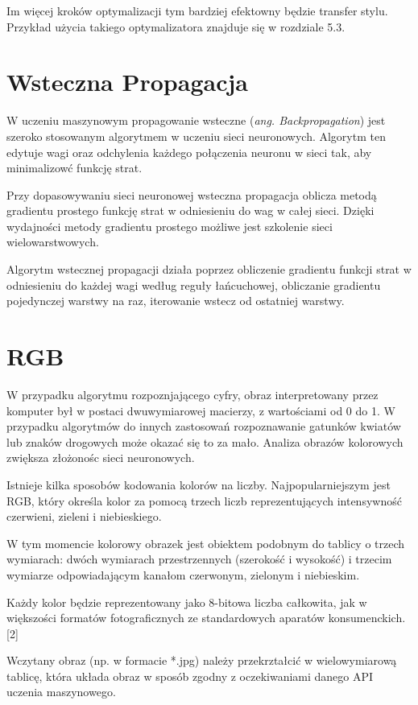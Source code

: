 \documentclass[brudnopis]{xmgr}
\begin{document}
Im więcej kroków optymalizacji tym bardziej efektowny będzie transfer stylu.
Przykład użycia takiego optymalizatora znajduje się w rozdziale 5.3.

\section{Wsteczna Propagacja\label{s:dsssl}}

W uczeniu maszynowym propagowanie wsteczne (\textit{ang. Backpropagation}) jest szeroko stosowanym algorytmem w uczeniu sieci neuronowych. Algorytm ten edytuje wagi oraz odchylenia każdego połączenia neuronu w sieci tak, aby minimalizowć funkcję strat.

Przy dopasowywaniu sieci neuronowej wsteczna propagacja oblicza metodą gradientu prostego funkcję strat w odniesieniu do wag w całej sieci. Dzięki wydajności metody gradientu prostego możliwe jest szkolenie sieci wielowarstwowych.

Algorytm wstecznej propagacji działa poprzez obliczenie gradientu funkcji strat w odniesieniu do każdej wagi według reguły łańcuchowej, obliczanie gradientu pojedynczej warstwy na raz, iterowanie wstecz od ostatniej warstwy. 


 \section{RGB\label{s:dsssl}}
 
 W przypadku algorytmu rozpoznjającego cyfry, obraz interpretowany przez komputer był w postaci dwuwymiarowej macierzy, z wartościami od 0 do 1. W przypadku algorytmów do innych zastosowań rozpoznawanie gatunków kwiatów lub znaków drogowych może okazać się to za mało. Analiza obrazów kolorowych zwiększa złożonośc sieci neuronowych. 
 
Istnieje kilka sposobów kodowania kolorów na liczby. Najpopularniejszym jest
RGB, który określa kolor za pomocą trzech liczb reprezentujących intensywność czerwieni, zieleni i niebieskiego. 

W tym momencie kolorowy obrazek jest obiektem podobnym do tablicy o trzech wymiarach: dwóch wymiarach przestrzennych (szerokość i wysokość) i trzecim wymiarze odpowiadającym kanałom czerwonym, zielonym i niebieskim. 

Każdy kolor będzie reprezentowany jako 8-bitowa liczba całkowita, jak w większości formatów fotograficznych ze standardowych aparatów konsumenckich. [2]

Wczytany obraz (np. w formacie *.jpg) należy przekrztałcić w wielowymiarową tablicę, która układa obraz w sposób zgodny z oczekiwaniami danego API uczenia maszynowego.
\end{document}
